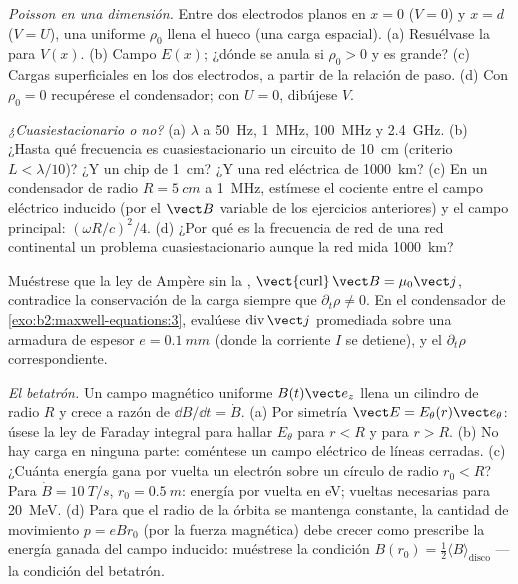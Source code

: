 \begin{exercise}[$\star\star$]\label{exo:b2:maxwell-equations:7}
\emph{Poisson en una dimensión.} Entre dos electrodos planos en $x = 0$
($V = 0$) y $x = d$ ($V = U$), una  uniforme $\rho_0$ llena el
hueco (una carga espacial). (a) Resuélvase la  para $V(x)$. (b) Campo
$E(x)$; ¿dónde se anula si $\rho_0 > 0$ y es grande? (c) Cargas superficiales en
los dos electrodos, a partir de la relación de paso. (d) Con $\rho_0 = 0$
recupérese el condensador; con $U = 0$, dibújese $V$.
\end{exercise}

\begin{exercise}[$\star\star$]\label{exo:b2:maxwell-equations:8}
\emph{¿Cuasiestacionario o no?} (a) $\lambda$ a \qty{50}{Hz}, \qty{1}{MHz},
\qty{100}{MHz} y \qty{2.4}{GHz}. (b) ¿Hasta qué frecuencia es cuasiestacionario un
circuito de \qty{10}{cm} (criterio $L < \lambda/10$)? ¿Y un chip de \qty{1}{cm}? ¿Y una
red eléctrica de \qty{1000}{km}? (c) En un condensador de radio $R = \qty{5}{cm}$ a
\qty{1}{MHz}, estímese el cociente entre el campo eléctrico inducido (por
el $\vect B$ variable de los ejercicios anteriores) y el campo principal: $(\omega R/c)^2
/4$. (d) ¿Por qué es la frecuencia de red de una red continental un
problema cuasiestacionario aunque la red mida \qty{1000}{km}?
\end{exercise}

\begin{exercise}[$\star\star$]\label{exo:b2:maxwell-equations:9}
Muéstrese que la ley de Ampère sin la , $\operatorname{\vect{curl}}
\vect B = \mu_0\vect j$, contradice la conservación de la carga siempre que $\partial_t\rho
\ne 0$. En el condensador de \cref{exo:b2:maxwell-equations:3}, evalúese
$\operatorname{div}\vect j$ promediada sobre una armadura de espesor $e = \qty{0.1}{mm}$
(donde la corriente $I$ se detiene), y el $\partial_t\rho$ correspondiente.
\end{exercise}

\begin{exercise}[$\star\star\star$]\label{exo:b2:maxwell-equations:10}
\emph{El betatrón.} Un campo magnético uniforme $B(t)\vect e_z$ llena un
cilindro de radio $R$ y crece a razón de $\dd B/\dd t = \dot B$. (a) Por simetría
$\vect E = E_\theta(r)\vect e_\theta$: úsese la ley de Faraday integral para hallar $E_\theta$
para $r < R$ y para $r > R$. (b) No hay carga en ninguna parte: coméntese
un campo eléctrico de líneas cerradas. (c) ¿Cuánta energía gana por vuelta
un electrón sobre un círculo de radio $r_0 < R$? Para $\dot B = \qty{10}{T/s}$,
$r_0 = \qty{0.5}{m}$: energía por vuelta en eV; vueltas necesarias para \qty{20}{MeV}.
(d) Para que el radio de la órbita se mantenga constante, la cantidad de
movimiento $p = eBr_0$ (por la fuerza magnética) debe crecer como prescribe
la energía ganada del campo inducido: muéstrese la condición $B(r_0) = \tfrac12\langle B\rangle_{\text{disco}}$
--- la condición del betatrón.
\end{exercise}

